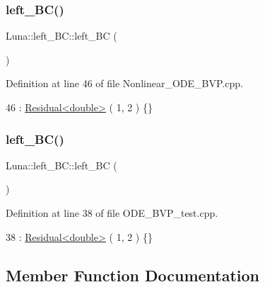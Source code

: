 \subsubsection{\texorpdfstring{left\+\_\+\+B\+C()}{left\_BC()}\hspace{0.1cm}{\footnotesize\ttfamily [1/2]}}
{\footnotesize\ttfamily Luna\+::left\+\_\+\+B\+C\+::left\+\_\+\+BC (\begin{DoxyParamCaption}{ }\end{DoxyParamCaption})\hspace{0.3cm}{\ttfamily [inline]}}



Definition at line 46 of file Nonlinear\+\_\+\+O\+D\+E\+\_\+\+B\+V\+P.\+cpp.


\begin{DoxyCode}
46 : \hyperlink{classLuna_1_1Residual}{Residual<double>} ( 1, 2 ) \{\}
\end{DoxyCode}
\mbox{\label{classLuna_1_1left__BC_aad6be08c3e07998f09dd7d8ac1876e5c}} 
\subsubsection{\texorpdfstring{left\+\_\+\+B\+C()}{left\_BC()}\hspace{0.1cm}{\footnotesize\ttfamily [2/2]}}
{\footnotesize\ttfamily Luna\+::left\+\_\+\+B\+C\+::left\+\_\+\+BC (\begin{DoxyParamCaption}{ }\end{DoxyParamCaption})\hspace{0.3cm}{\ttfamily [inline]}}



Definition at line 38 of file O\+D\+E\+\_\+\+B\+V\+P\+\_\+test.\+cpp.


\begin{DoxyCode}
38 : \hyperlink{classLuna_1_1Residual}{Residual<double>} ( 1, 2 ) \{\}
\end{DoxyCode}


\subsection{Member Function Documentation}
\mbox{\label{classLuna_1_1left__BC_a01645de89a78c7c925d60bb68e994c90}} 
